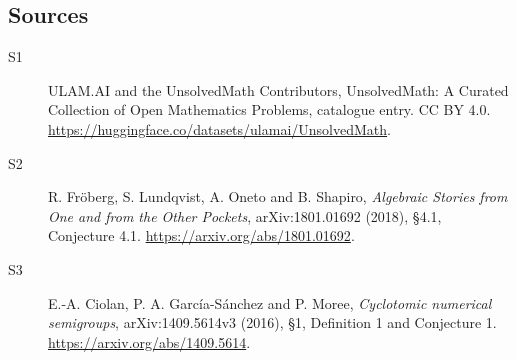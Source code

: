 \documentclass[11pt]{article}
\begin{document}
\subsection{Sources}
\begin{description}
\item[\hypertarget{source:statement:1}{S1}] ULAM.AI and the UnsolvedMath Contributors, UnsolvedMath: A Curated Collection of Open Mathematics Problems, catalogue entry. CC BY 4.0. \url{https://huggingface.co/datasets/ulamai/UnsolvedMath}.
\item[\hypertarget{source:statement:2}{S2}] R. Fröberg, S. Lundqvist, A. Oneto and B. Shapiro, \emph{Algebraic Stories from One and from the Other Pockets}, arXiv:1801.01692 (2018), §4.1, Conjecture 4.1. \url{https://arxiv.org/abs/1801.01692}.
\item[\hypertarget{source:statement:3}{S3}] E.-A. Ciolan, P. A. García-Sánchez and P. Moree, \emph{Cyclotomic numerical semigroups}, arXiv:1409.5614v3 (2016), §1, Definition 1 and Conjecture 1. \url{https://arxiv.org/abs/1409.5614}.
\end{description}
\label{end:statement}
\end{document}
